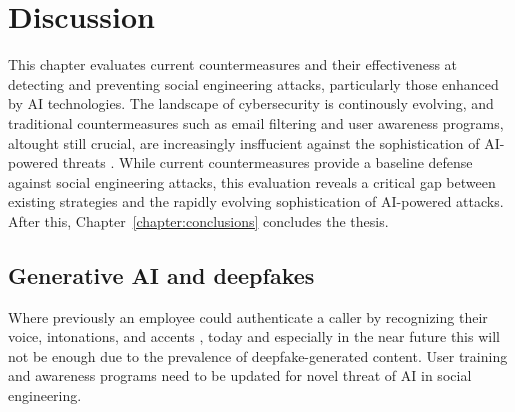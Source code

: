


\chapter{Discussion\label{chapter:evaluation}}
\begin{comment}

Guides:
    - Rest of the thesis (thesis max of 20 - other chapters and pages)
    - Fill the thesis with content in this chapter

TODO:
    [ ] 

What to cover:
    - OpenAI attempts to control how ChatGPT etc are used
    - Efficacy of EU and other level regulations
    - Instagram flagging content that might've been generated with AI (this is futile in the future?)

\end{comment}

This chapter evaluates current countermeasures and their effectiveness at detecting and preventing social engineering attacks, particularly those enhanced by AI technologies. The landscape of cybersecurity is continously evolving, and traditional countermeasures such as email filtering and user awareness programs, altought still crucial, are increasingly insffucient against the sophistication of AI-powered threats \citep{fakhouriAIDrivenSolutionsForSocialEngineeringAttacks2024}. While current countermeasures provide a baseline defense against social engineering attacks, this evaluation reveals a critical gap between existing strategies and the rapidly evolving sophistication of AI-powered attacks. After this, Chapter~\ref{chapter:conclusions} concludes the thesis.













\section{Generative AI and deepfakes}
\begin{comment}    
    - Deepfake content detection
    - Spear phishing detection
\end{comment}

Where previously an employee could authenticate a caller by recognizing their voice, intonations, and accents \citep{mitnick_The_Art_of_Deception_2003}, today and especially in the near future this will not be enough due to the prevalence of deepfake-generated content. User training and awareness programs need to be updated for novel threat of AI in social engineering.



